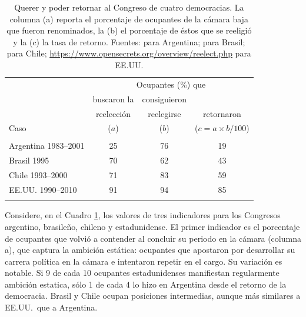 \documentclass[letter,12pt]{article}
\newcommand{\mc}{\multicolumn}
\begin{document}
\begin{table}
  \centering
  \begin{tabular}{lccc}
                         & \mc{3}{c}{Ocupantes (\%) que} \\ 
                         & buscaron la & consiguieron    &            \\ [-.5ex]
                         & reelección  & reelegirse      & retornaron \\ [-.5ex]
    Caso                 & ($a$)       & ($b$)           & ($c=a\times b/100$) \\ \hline \\ [-1.25ex] 
    Argentina 1983--2001 & 25          &  76             &     19     \\
    Brasil 1995          & 70          &  62             &     43     \\
    Chile 1993--2000     & 71          &  83             &     59     \\
    EE.UU. 1990--2010    & 91          &  94             &     85     \\ \\ [-1.25ex] \hline
  \end{tabular}
  \caption{Querer y poder retornar al Congreso de cuatro democracias. La columna (a) reporta el porcentaje de ocupantes de la cámara baja que fueron renominados, la (b) el porcentaje de éstos que se reeligió y la (c) la tasa de retorno. Fuentes: \citet[][:658]{jones.etal.amateurLegis.2002} para Argentina; \citet[][:415--6]{morgenstern.2002b} para Brasil; \citet{naviaIncumbency.2000} para Chile; \url{https://www.opensecrets.org/overview/reelect.php} para EE.UU.}\label{T:retRate}
\end{table}

Considere, en el Cuadro \ref{T:retRate}, los valores de tres indicadores para los Congresos argentino, brasileño, chileno y estadunidense. El primer indicador es el porcentaje de ocupantes que volvió a contender al concluir su periodo en la cámara (columna a), que captura la ambición estática: ocupantes que apostaron por desarrollar su carrera política en la cámara e intentaron repetir en el cargo. Su variación es notable. Si 9 de cada 10 ocupantes estadunidenses manifiestan regularmente ambición estatica, sólo 1 de cada 4 lo hizo en Argentina desde el retorno de la democracia. Brasil y Chile ocupan posiciones intermedias, aunque más similares a EE.UU.\ que a Argentina.
\end{document}
